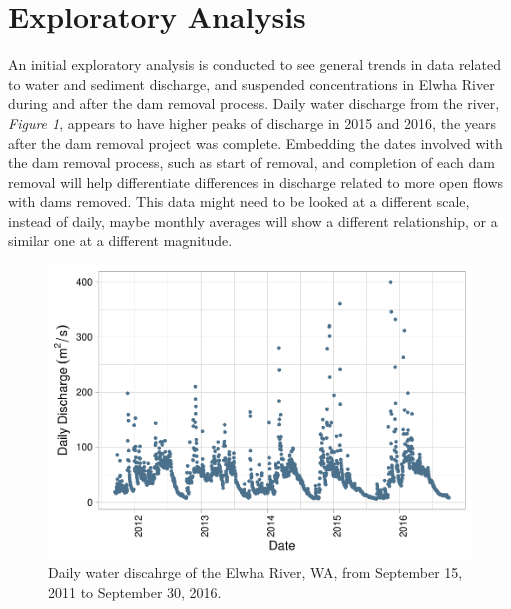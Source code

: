 \documentclass[12pt,]{article}
\begin{document}
\newpage

\hypertarget{exploratory-analysis}{%
\section{Exploratory Analysis}\label{exploratory-analysis}}

An initial exploratory analysis is conducted to see general trends in
data related to water and sediment discharge, and suspended
concentrations in Elwha River during and after the dam removal process.
Daily water discharge from the river, \emph{Figure 1}, appears to have
higher peaks of discharge in 2015 and 2016, the years after the dam
removal project was complete. Embedding the dates involved with the dam
removal process, such as start of removal, and completion of each dam
removal will help differentiate differences in discharge related to more
open flows with dams removed. This data might need to be looked at a
different scale, instead of daily, maybe monthly averages will show a
different relationship, or a similar one at a different magnitude.

\begin{figure}
\centering
\includegraphics{Mason_ENV872_ProjectFinal_files/figure-latex/Exploratory Analysis Figure 1-1.pdf}
\caption{Daily water discahrge of the Elwha River, WA, from September
15, 2011 to September 30, 2016.}
\end{figure}
\end{document}
